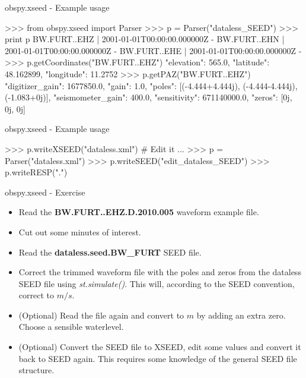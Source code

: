 \begin{frame}{obspy.xseed - Example usage}
\begin{myColorBox}{0.95}{}
\begin{python}
>>> from obspy.xseed import Parser
>>> p = Parser("dataless_SEED")
>>> print p
BW.FURT..EHZ | 2001-01-01T00:00:00.000000Z -
BW.FURT..EHN | 2001-01-01T00:00:00.000000Z -
BW.FURT..EHE | 2001-01-01T00:00:00.000000Z -
>>> p.getCoordinates("BW.FURT..EHZ")
{"elevation": 565.0, "latitude": 48.162899,
 "longitude": 11.2752}
>>> p.getPAZ("BW.FURT..EHZ")
{"digitizer_gain": 1677850.0,
 "gain": 1.0,
 "poles": [(-4.444+4.444j), (-4.444-4.444j), (-1.083+0j)],
 "seismometer_gain": 400.0,
 "sensitivity": 671140000.0,
 "zeros": [0j, 0j, 0j]}
\end{python}
\end{myColorBox}
\end{frame}


\begin{frame}{obspy.xseed - Example usage}
\begin{myColorBox}{0.95}{}
\begin{python}
>>> p.writeXSEED("dataless.xml")
# Edit it ...
>>> p = Parser("dataless.xml")
>>> p.writeSEED("edit_dataless_SEED")
>>> p.writeRESP(".")
\end{python}
\end{myColorBox}
\end{frame}


\begin{frame}{obspy.xseed - Exercise}
    \begin{itemize}
        \item Read the \textbf{BW.FURT..EHZ.D.2010.005} waveform example file.
        \item Cut out some minutes of interest.
        \item Read the \textbf{dataless.seed.BW\_FURT} SEED file.
        \item Correct the trimmed waveform file with the poles and zeros from
            the dataless SEED file using \textit{st.simulate()}. This will,
            according to the SEED convention, correct to $m/s$.
        \item (Optional) Read the file again and convert to $m$ by adding an
            extra zero. Choose a sensible waterlevel.
        \item (Optional) Convert the SEED file to XSEED, edit some values and
            convert it back to SEED again. This requires some knowledge of the
            general SEED file structure.
    \end{itemize}
\end{frame}



